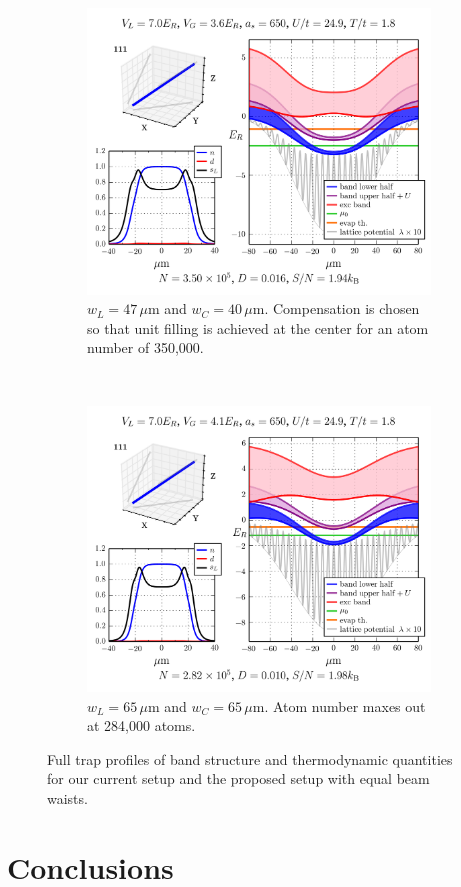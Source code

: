 \documentclass[11pt,letter]{article}
\begin{document}
\begin{figure}
        \centering
        \begin{subfigure}[t]{0.45\textwidth}
		\includegraphics[width=\textwidth]{figures/ir47-gr40_7Er-comp3p642.png}
\caption{ $w_{L} = 47\,\mu$m and $w_{C}=40\,\mu$m.  Compensation is chosen so
that unit filling is achieved at the center for an atom number of 350,000. }
        \end{subfigure}
        ~ %
        \begin{subfigure}[t]{0.45\textwidth}
		\includegraphics[width=\textwidth]{figures/ir65-gr65_7Er-comp4p08.png}
\caption{ $w_{L} = 65\,\mu$m and $w_{C}=65\,\mu$m.  Atom number maxes out at 284,000 atoms. }
        \end{subfigure}%
	\caption{Full trap profiles of band structure and thermodynamic
quantities for our current setup and the proposed setup with equal beam waists.} 
\label{fig:etaF-before-after}
\end{figure}

 



 
\section{ Conclusions }

\newpage



\end{document}

